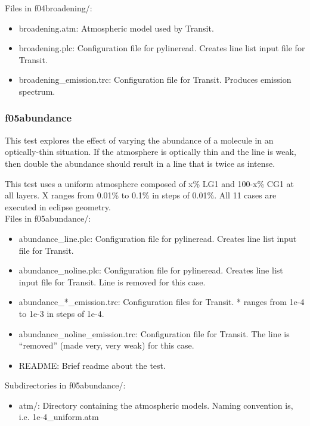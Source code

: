 \documentclass[letterpaper, 12pt]{article}
\begin{document}
Files in f04broadening/:
\begin{itemize} \itemsep0pt
  \item broadening.atm: Atmospheric model used by Transit.
  \item broadening.plc: Configuration file for pylineread. Creates line 
        list input file for Transit.
  \item broadening{\_}emission.trc: Configuration file for Transit. Produces 
        emission spectrum.
\end{itemize}

\subsubsection{f05abundance}
\label{sec:abundance}
This test explores the effect of varying the abundance of a molecule in an 
optically-thin situation. If the atmosphere is optically thin and the line 
is weak, then double the abundance should result in a line that is twice as 
intense.

This test uses a uniform atmosphere composed of x\% LG1 and 100-x\% CG1 at 
all layers. X ranges from 0.01\% to 0.1\% in steps of 0.01\%. All 11 cases 
are executed in eclipse geometry.\\

Files in f05abundance/:
\begin{itemize} \itemsep0pt
  \item abundance{\_}line.plc: Configuration file for pylineread. Creates 
        line list input file for Transit.
  \item abundance{\_}noline.plc: Configuration file for pylineread. 
        Creates line list input file for Transit. Line is removed for this case.
  \item abundance{\_}*{\_}emission.trc: Configuration files for Transit. * ranges 
        from 1e-4 to 1e-3 in steps of 1e-4.
  \item abundance{\_}noline{\_}emission.trc: Configuration file for Transit. The 
        line is ``removed'' (made very, very weak) for this case.
  \item README: Brief readme about the test.
\end{itemize}

Subdirectories in f05abundance/:
\begin{itemize} \itemsep0pt
  \item atm/: Directory containing the atmospheric models. Naming convention 
        is, i.e. 1e-4{\_}uniform.atm
\end{itemize}
\end{document}
